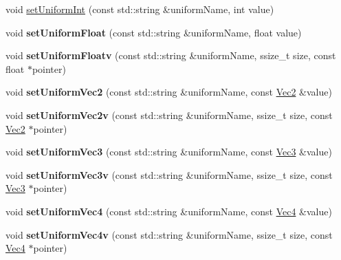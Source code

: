\begin{DoxyCompactItemize}
\item 
void \hyperlink{classGLProgramState_a7de1ddee54075d6279b8defcdcd33578}{set\+Uniform\+Int} (const std\+::string \&uniform\+Name, int value)
\item 
\mbox{\label{classGLProgramState_a37692ba572e3aacb7588c89b3ff16cf6}} 
void {\bfseries set\+Uniform\+Float} (const std\+::string \&uniform\+Name, float value)
\item 
\mbox{\label{classGLProgramState_a187cac4c543cb0e1684ecb7f2e7a40c7}} 
void {\bfseries set\+Uniform\+Floatv} (const std\+::string \&uniform\+Name, ssize\+\_\+t size, const float $\ast$pointer)
\item 
\mbox{\label{classGLProgramState_a41e272a65d9d8abe4a45228d3be99acf}} 
void {\bfseries set\+Uniform\+Vec2} (const std\+::string \&uniform\+Name, const \hyperlink{classVec2}{Vec2} \&value)
\item 
\mbox{\label{classGLProgramState_aed7172f9d06375c8f6902b2b2c451674}} 
void {\bfseries set\+Uniform\+Vec2v} (const std\+::string \&uniform\+Name, ssize\+\_\+t size, const \hyperlink{classVec2}{Vec2} $\ast$pointer)
\item 
\mbox{\label{classGLProgramState_aa2ed326e2b82c143c3751a0d99a5071c}} 
void {\bfseries set\+Uniform\+Vec3} (const std\+::string \&uniform\+Name, const \hyperlink{classVec3}{Vec3} \&value)
\item 
\mbox{\label{classGLProgramState_a32101794108848a9a3695530cb060e3d}} 
void {\bfseries set\+Uniform\+Vec3v} (const std\+::string \&uniform\+Name, ssize\+\_\+t size, const \hyperlink{classVec3}{Vec3} $\ast$pointer)
\item 
\mbox{\label{classGLProgramState_ad48e35f99fd4f1aafd2103885662aff4}} 
void {\bfseries set\+Uniform\+Vec4} (const std\+::string \&uniform\+Name, const \hyperlink{classVec4}{Vec4} \&value)
\item 
\mbox{\label{classGLProgramState_a33cc95c198eb80df2ba3e8e3830613a6}} 
void {\bfseries set\+Uniform\+Vec4v} (const std\+::string \&uniform\+Name, ssize\+\_\+t size, const \hyperlink{classVec4}{Vec4} $\ast$pointer)

\end{DoxyCompactItemize}
